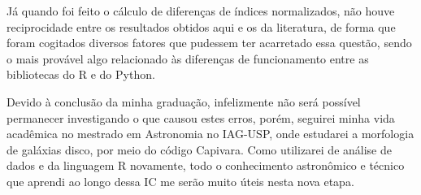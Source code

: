 \documentclass[12pt]{projeto}
\begin{document}
Já quando foi feito o cálculo de diferenças de índices normalizados, não houve reciprocidade entre os resultados obtidos aqui e os da literatura, de forma que foram cogitados diversos fatores que pudessem ter acarretado essa questão, sendo o mais provável algo relacionado às diferenças de funcionamento entre as bibliotecas do R e do Python.

Devido à conclusão da minha graduação, infelizmente não será possível permanecer investigando o que causou estes erros, porém, seguirei minha vida acadêmica no mestrado em Astronomia no IAG-USP, onde estudarei a morfologia de galáxias disco, por meio do código Capivara. Como utilizarei de análise de dados e da linguagem R novamente, todo o conhecimento astronômico e técnico que aprendi ao longo dessa IC me serão muito úteis nesta nova etapa. 



\begin{thebibliography}{99}
\end{thebibliography}
\end{document}

